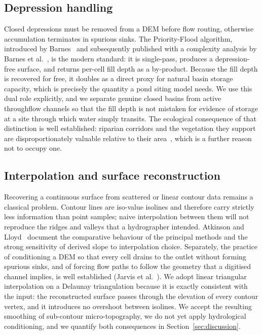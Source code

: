 \documentclass[sigconf,review,10pt]{acmart}
\begin{document}
\subsection{Depression handling}

Closed depressions must be removed from a DEM before flow routing,
otherwise accumulation terminates in spurious sinks. The
Priority-Flood algorithm, introduced by Barnes~\cite{barnes2004} and
subsequently published with a complexity analysis by Barnes et
al.~\cite{barnes2014}, is the modern standard: it is single-pass, produces
a depression-free surface, and returns per-cell fill depth as a
by-product. Because the fill depth is recovered for free, it doubles as a
direct proxy for natural basin storage capacity, which is precisely the
quantity a pond siting model needs. We use this dual role explicitly, and
we separate genuine closed basins from active throughflow channels so that
the fill depth is not mistaken for evidence of storage at a site through
which water simply transits. The ecological consequence of that
distinction is well established: riparian corridors and the vegetation
they support are disproportionately valuable relative to their
area~\cite{dodorico2000}, which is a further reason not to occupy one.

\subsection{Interpolation and surface reconstruction}

Recovering a continuous surface from scattered or linear contour data
remains a classical problem. Contour lines are iso-value isolines and
therefore carry strictly less information than point samples; naive
interpolation between them will not reproduce the ridges and valleys that
a hydrographer intended. Atkinson and Lloyd~\cite{atkinson1998} document
the comparative behaviour of the principal methods and the strong
sensitivity of derived slope to interpolation choice. Separately, the
practice of conditioning a DEM so that every cell drains to the outlet
without forming spurious sinks, and of forcing flow paths to follow the
geometry that a digitised channel implies, is well established
(Jarvis et al.~\cite{jarvis2008}). We adopt linear
triangular interpolation on a Delaunay triangulation because it is
exactly consistent with the input: the reconstructed surface passes through
the elevation of every contour vertex, and it introduces no overshoot
between isolines. We accept the resulting smoothing of sub-contour
micro-topography, we do not yet apply hydrological conditioning, and we
quantify both consequences in Section~\ref{sec:discussion}.
\end{document}

